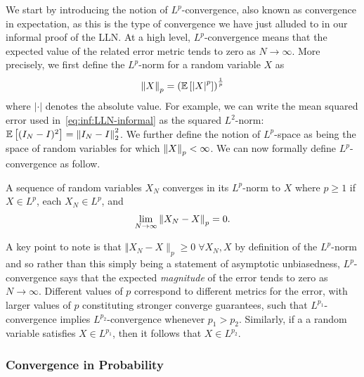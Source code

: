 We start by introducing the notion of $L^p$-convergence, also known as convergence in expectation,
as this is the type of convergence we have just alluded to in our informal proof of the LLN.
At a high level, $L^p$-convergence means that the expected value of the related error metric
tends to zero as $N\rightarrow \infty$.  More precisely, we first define the $L^p$-norm for
a random variable $X$ as
\begin{align}
\label{eq:inf:Lp-norm}
\left\lVert X\right\rVert_p = \left(\mathbb{E} \left[\left|X\right|^{p}\right]\right)^{\frac{1}{p}}
\end{align}
where $\left|\cdot\right|$ denotes the absolute value.  For example, we can write the
mean squared error used in~\eqref{eq:inf:LLN-informal} as the squared $L^2$-norm:
$\mathbb{E} \left[(I_N-I)^2\right] = \left\lVert I_N-I\right\rVert_2^2$.  We further define the notion of $L^p$-space
as being the space of random variables for which $\left\lVert X\right\rVert_p < \infty$.  We can now
formally define $L^p$-convergence as follow.
\begin{definition}[$L^p$-convergence]
A sequence of random variables $X_N$ converges in its $L^p$-norm to 
$X$ where $p\ge1$ if $X\in L^p$, each $X_N \in L^p$, and
\begin{align}
\lim\limits_{N\rightarrow\infty} \left\lVert X_N-X\right\rVert_p=0. \label{eq:inf:Lp-conv-formal}
\end{align}
\end{definition}
A key point to note is that $\Vert X_N-X\rVert_p\ge0 \; \forall X_N, X$ by definition of the $L^p$-norm and so
rather than this simply being a statement of asymptotic unbiasedness, $L^p$-convergence says that the expected
\emph{magnitude} of the error tends to zero as $N\rightarrow\infty$.
Different values of $p$ correspond to different metrics for the error, with larger values of
$p$ constituting stronger converge guarantees, such that $L^{p_1}$-convergence implies
$L^{p_2}$-convergence whenever $p_1>p_2$.  Similarly, if a a random variable satisfies
$X \in L^{p_1}$, then it follows that $X \in L^{p_2}$.

%
%

\subsubsection{Convergence in Probability}
\label{sec:inf:mc:conv:prob}

